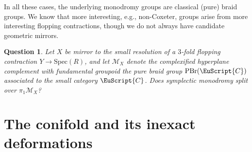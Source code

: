 \documentclass[pdftex]{sigma}
\newcommand{\scrC}{\EuScript{C}}
\newtheorem{qn}[thm]{Question}
\theoremstyle{definition}
\numberwithin{equation}{section}
\begin{document}
In all these cases, the underlying monodromy groups are classical (pure) braid groups. We know that more interesting, e.g., non-Coxeter, groups arise from more interesting flopping contractions, though we do not always have candidate geometric mirrors.

\begin{qn}
Let $X$ be mirror to the small resolution of a $3$-fold flopping contraction $Y \to \mathrm{Spec}(R)$, and let $\mathcal{M}_X$ denote the complexified hyperplane complement with fundamental groupoid the pure braid group ${\rm PBr}(\scrC)$ associated to the small category $\scrC$. Does symplectic monodromy split over $\pi_1\mathcal{M}_X$?
\end{qn}

\section{The conifold and its inexact deformations} \label{sec:conifold}
\end{document}

